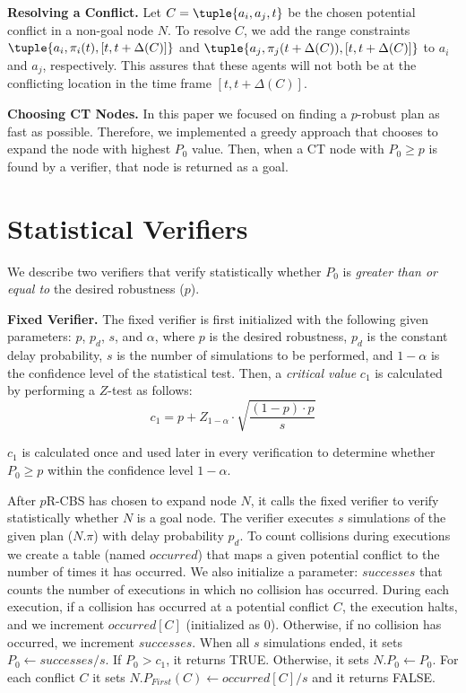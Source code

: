 \documentclass[letterpaper]{article} %
\newcommand{\prcbs}{$p$R-CBS\xspace}
\begin{document}
{\bf Resolving a Conflict.} Let $C=\tuple{a_i,a_j,t}$ be the chosen potential conflict in a non-goal node $N$. To resolve $C$, we add the range constraints
$\tuple{a_i, \pi_i(t), [t, t+\Delta(C)]}$ and $\tuple{a_j, \pi_j(t+\Delta(C)), [t, t+\Delta(C)]}$ to $a_i$ and $a_j$, respectively. This assures that these agents will not both be at the conflicting location in the time frame $[t,t+\Delta(C)]$.

{\bf Choosing CT Nodes.} In this paper we focused on finding a $p$-robust plan as fast as possible. Therefore, we implemented a greedy approach that chooses to expand the node with highest $P_0$ value. Then, when a CT node with $P_0\geq p$ is found by a verifier, that node is returned as a goal. 




\section{Statistical Verifiers}
\label{sec:stat-verifier}
We describe two verifiers that verify statistically whether $P_0$ is {\em greater than or equal to} the desired robustness ($p$).

{\bf Fixed Verifier.} The fixed verifier is first initialized with the following given parameters: $p$, $p_d$, $s$, and $\alpha$, where $p$ is the desired robustness, $p_d$ is the constant delay probability, $s$ is the number of simulations to be performed, and $1-\alpha$ is the confidence level of the statistical test. Then, a {\em critical value} $c_1$ is calculated by performing a $Z$-test as follows:
\begin{equation}
{   c_1=p+Z_{1-\alpha} \cdot \sqrt{\frac{(1-p) \cdot p}{s}}}
\label{equ:critical}
\end{equation}

$c_1$ is calculated once and used later in every verification to determine whether $P_0 \geq p$ within the confidence level $1-\alpha$.

After \prcbs{} has chosen to expand node $N$, it calls the fixed verifier to verify statistically whether $N$ is a goal node. The verifier executes $s$ simulations of the given plan ($N.\pi$) with delay probability $p_d$. To count collisions during executions we create a table (named $\mathit{occurred}$) that maps a given potential conflict to the number of times it has occurred. We also initialize a parameter: $\mathit{successes}$ that counts the number of executions in which no collision has occurred. During each execution, if a collision has occurred at a potential conflict $C$, the execution halts, and we increment $\mathit{occurred[C]}$ (initialized as $0$). Otherwise, if no collision has occurred, we increment $\mathit{successes}$. When all $s$ simulations ended, it sets $P_0 \gets \mathit{successes}/s$. If $P_0 > c_1$, it returns TRUE. Otherwise, it sets $N.P_0 \gets P_0$. For each conflict $C$ it sets $N.P_{First}(C) \gets \mathit{occurred[C]}/{s}$ and it returns FALSE.
\end{document}
